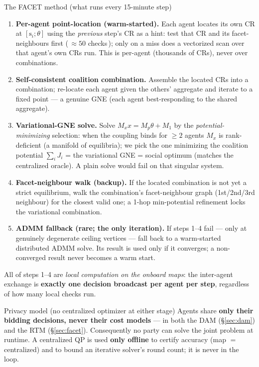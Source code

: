 \documentclass[11pt, letterpaper]{article}
\begin{document}
\begin{keybox}{The FACET method (what runs every 15-minute step)}
\begin{enumerate}[leftmargin=1.6em,nosep]
\item \textbf{Per-agent point-location (warm-started).} Each agent locates its own CR at
$[\mathrm{s}_i;\theta]$ using the \emph{previous} step's CR as a hint: test that CR and its
facet-neighbours first (\,$\approx\!50$ checks\,); only on a miss does a vectorized scan over that
agent's own CRs run. This is per-agent (thousands of CRs), never over combinations.
\item \textbf{Self-consistent coalition combination.} Assemble the located CRs into a combination;
re-locate each agent given the others' aggregate and iterate to a fixed point --- a genuine GNE
(each agent best-responding to the shared aggregate).
\item \textbf{Variational-GNE solve.} Solve $M_x x=M_p\theta+M_1$ by the \emph{potential-minimizing}
selection: when the coupling binds for $\ge2$ agents $M_x$ is rank-deficient (a manifold of
equilibria); we pick the one minimizing the coalition potential $\sum_i J_i$ = the variational GNE =
social optimum (matches the centralized oracle). A plain solve would fail on that singular system.
\item \textbf{Facet-neighbour walk (backup).} If the located combination is not yet a strict
equilibrium, walk the combination's facet-neighbour graph (1st/2nd/3rd neighbour) for the closest
valid one; a 1-hop min-potential refinement locks the variational combination.
\item \textbf{ADMM fallback (rare; the only iteration).} If steps 1--4 fail --- only at genuinely
degenerate ceiling vertices --- fall back to a warm-started distributed ADMM solve. Its result is
used only if it converges; a non-converged result never becomes a warm start.
\end{enumerate}
All of steps 1--4 are \emph{local computation on the onboard maps}: the inter-agent exchange is
\textbf{exactly one decision broadcast per agent per step}, regardless of how many local checks run.
\end{keybox}

\begin{keybox}{Privacy model (no centralized optimizer at either stage)}
Agents share \textbf{only their bidding decisions, never their cost models} --- in both the DAM
(\S\ref{sec:dam}) and the RTM (\S\ref{sec:facet}). Consequently no party can solve the joint problem
at runtime. A centralized QP is used \textbf{only offline} to certify accuracy (map $=$ centralized)
and to bound an iterative solver's round count; it is never in the loop.
\end{keybox}
\end{document}

